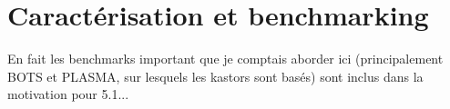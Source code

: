 \section{Caractérisation et benchmarking}\label{sec:rw:benchmarking}

\begin{todo}
  En fait les benchmarks important que je comptais aborder ici (principalement BOTS et PLASMA, sur lesquels les kastors sont basés) sont inclus dans la motivation pour 5.1...
\end{todo}









